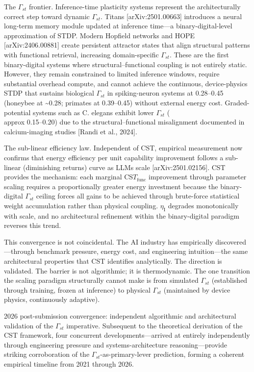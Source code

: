 \documentclass[a4paper,12pt]{article}
\begin{document}
The $\Gamma_{st}$ frontier. Inference-time plasticity systems represent the architecturally correct step toward dynamic $\Gamma_{st}$. Titans [arXiv:2501.00663] introduces a neural long-term memory module updated at inference time---a binary-digital-level approximation of STDP. Modern Hopfield networks and HOPE [arXiv:2406.00881] create persistent attractor states that align structural patterns with functional retrieval, increasing domain-specific $\Gamma_{st}$. These are the first binary-digital systems where structural--functional coupling is not entirely static. However, they remain constrained to limited inference windows, require substantial overhead compute, and cannot achieve the continuous, device-physics STDP that sustains biological $\Gamma_{st}$ in spiking-neuron systems at 0.28--0.45 (honeybee at \textasciitilde{}0.28; primates at 0.39--0.45) without external energy cost. Graded-potential systems such as C. elegans exhibit lower $\Gamma_{st}$ ( \\approx  0.15--0.20) due to the structural--functional misalignment documented in calcium-imaging studies [Randi et al., 2024].


The sub-linear efficiency law. Independent of CST, empirical measurement now confirms that energy efficiency per unit capability improvement follows a sub-linear (diminishing returns) curve as LLMs scale [arXiv:2501.02156]. CST provides the mechanism: each marginal CS$T_{\text{func}}$ improvement through parameter scaling requires a proportionally greater energy investment because the binary-digital $\Gamma_{st}$ ceiling forces all gains to be achieved through brute-force statistical weight accumulation rather than physical coupling. $\eta_{\text{I}}$ degrades monotonically with scale, and no architectural refinement within the binary-digital paradigm reverses this trend.


This convergence is not coincidental. The AI industry has empirically discovered---through benchmark pressure, energy cost, and engineering intuition---the same architectural properties that CST identifies analytically. The direction is validated. The barrier is not algorithmic; it is thermodynamic. The one transition the scaling paradigm structurally cannot make is from simulated $\Gamma_{st}$ (established through training, frozen at inference) to physical $\Gamma_{st}$ (maintained by device physics, continuously adaptive).


2026 post-submission convergence: independent algorithmic and architectural validation of the $\Gamma_{st}$ imperative. Subsequent to the theoretical derivation of the CST framework, four concurrent developments---arrived at entirely independently through engineering pressure and systems-architecture reasoning---provide striking corroboration of the $\Gamma_{st}$-as-primary-lever prediction, forming a coherent empirical timeline from 2021 through 2026.
\end{document}

